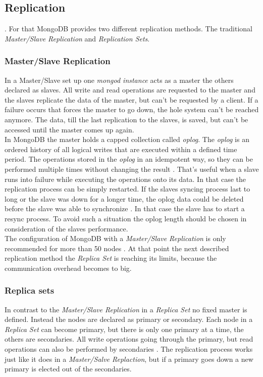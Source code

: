 \subsection{Replication}
. For that MongoDB provides two different replication methods. The traditional \textit{Master/Slave Replication} and \textit{Replication Sets}.

\subsubsection{Master/Slave Replication}
In a Master/Slave set up one \textit{mongod instance} acts as a master the others declared as slaves. All write and read operations are requested to the master and the slaves replicate the data of the master, but can't be requested by a client. If a failure occurs that forces the master to go down, the hole system can't be reached anymore. The data, till the last replication to the slaves, is saved, but can't be accessed until the master comes up again. \\
In MongoDB the master holds a capped collection called \textit{oplog}. The \textit{oplog} is an ordered history of all logical writes that are executed within a defined time period. The operations stored in the \textit{oplog} in an idempotent way, so they can be performed multiple times without changing the result \cite{pracmong}. That's useful when a slave runs into failure while executing the operations onto its data. In that case the replication process can be simply restarted. If the slaves syncing process last to long or the slave was down for a longer time, the oplog data could be deleted before the slave was able to synchronize \cite{pracmong}. In that case the slave has to start a resync process. To avoid such a situation the oplog length should be chosen in consideration of the slaves performance.\\
The configuration of MongoDB with a \textit{Master/Slave Replication} is only recommended for more than 50 nodes \cite{pracmong}. At that point the next described replication method the \textit{Replica Set} is reaching its limits, because the communication overhead becomes to big.

\subsubsection{Replica sets}
In contrast to the \textit{Master/Slave Replication} in a \textit{Replica Set} no fixed master is defined. Instead the nodes are declared as primary or secondary. Each node in a \textit{Replica Set} can become primary, but there is only one primary at a time, the others are secondaries. All write operations going through the primary, but read operations can also be performed by secondaries \cite{pracmong}. The replication process works just like it does in a \textit{Master/Salve Replaction}, but if a primary goes down a new primary is elected out of the secondaries.

